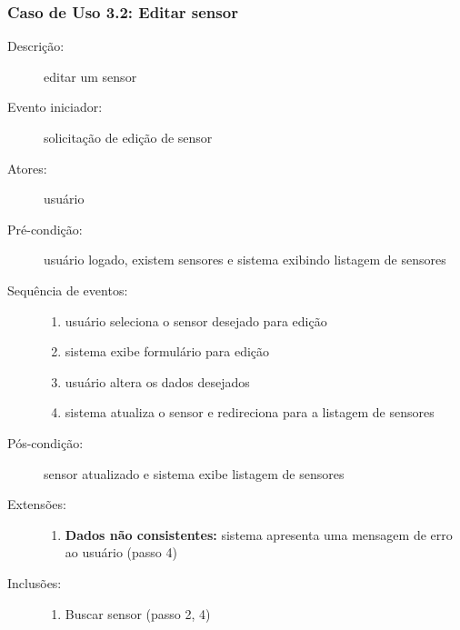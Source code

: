 \subsubsection{Caso de Uso 3.2: Editar sensor}
\begin{description}
	\item[Descrição:] editar um sensor
	\item[Evento iniciador:] solicitação de edição de sensor
	\item[Atores:] usuário
	\item[Pré-condição:] usuário logado, existem sensores e sistema exibindo listagem de sensores
	\item[Sequência de eventos:] \hfill
		\begin{enumerate}
			\item{usuário seleciona o sensor desejado para edição}
			\item{sistema exibe formulário para edição}
			\item{usuário altera os dados desejados}
			\item{sistema atualiza o sensor e redireciona para a listagem de sensores}
		\end{enumerate}
	\item[Pós-condição:] sensor atualizado e sistema exibe listagem de sensores
	\item[Extensões:] \hfill
		\begin{enumerate}
			\item{\textbf{Dados não consistentes:} sistema apresenta uma mensagem de erro ao usuário (passo 4)}
		\end{enumerate}
	\item[Inclusões:] \hfill
		\begin{enumerate}
			\item{Buscar sensor (passo 2, 4)}
		\end{enumerate}
\end{description}
%
